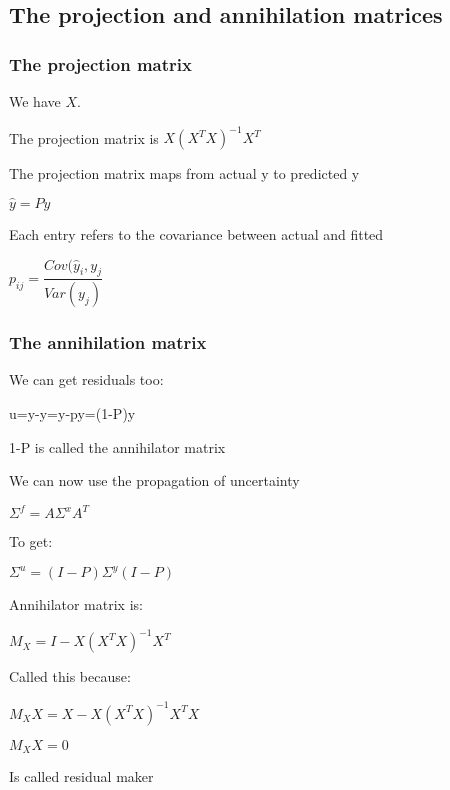 
\subsection{The projection and annihilation matrices}

\subsubsection{The projection matrix}

We have \(X\).

The projection matrix is \(X(X^TX)^{-1}X^T\)

The projection matrix maps from actual y to predicted y

\(\hat y = Py\)

Each entry refers to the covariance between actual and fitted

\(p_{ij}=\dfrac{Cov (\hat y_i, y_j}{Var (y_j)}\)

\subsubsection{The annihilation matrix}

We can get residuals too:

u=y-\hat y=y-py=(1-P)y

1-P is called the annihilator matrix

We can now use the propagation of uncertainty

\(\Sigma^f = A\Sigma^x A^T\)

To get:

\(\Sigma^u = (I-P)\Sigma^y (I-P)\)

Annihilator matrix is:

\(M_X=I-X(X^TX)^{-1}X^T\)

Called this because:

\(M_XX=X-X(X^TX)^{-1}X^TX\)

\(M_XX=0\)

Is called residual maker

